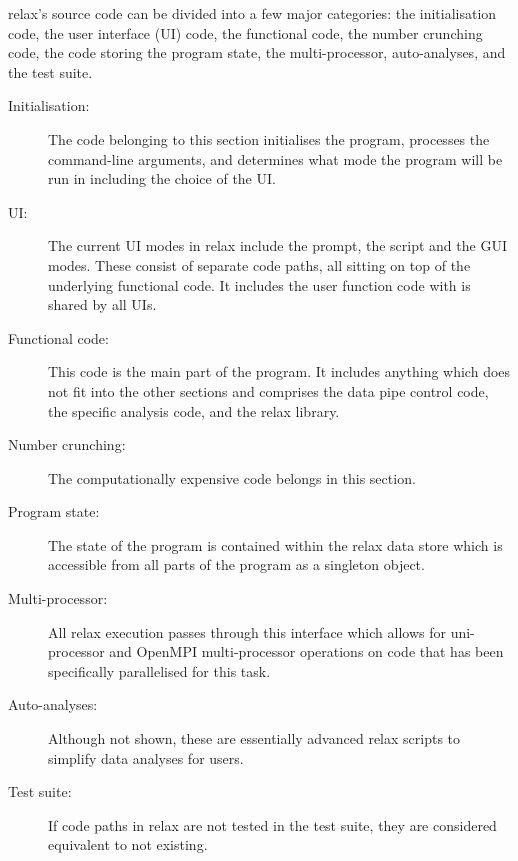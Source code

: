 relax's source code can be divided into a few major categories:  the initialisation code, the user interface (UI) code, the functional code, the number crunching code, the code storing the program state, the multi-processor, auto-analyses, and the test suite.
\begin{description}
  \item[Initialisation:]  The code belonging to this section initialises the program, processes the command-line arguments, and determines what mode the program will be run in including the choice of the UI.
  \item[UI:]  The current UI modes in relax include the prompt, the script and the GUI modes.
    These consist of separate code paths, all sitting on top of the underlying functional code.
    It includes the user function code with is shared by all UIs.
  \item[Functional code:]  This code is the main part of the program.
    It includes anything which does not fit into the other sections and comprises the data pipe control code, the specific analysis code, and the relax library.
  \item[Number crunching:]  The computationally expensive code belongs in this section.
  \item[Program state:]  The state of the program is contained within the relax data store which is accessible from all parts of the program as a singleton object.
  \item[Multi-processor:]  All relax execution passes through this interface which allows for uni-processor and OpenMPI multi-processor operations on code that has been specifically parallelised for this task.
  \item[Auto-analyses:]  Although not shown, these are essentially advanced relax scripts to simplify data analyses for users.
  \item[Test suite:]  If code paths in relax are not tested in the test suite, they are considered equivalent to not existing.
\end{description}

